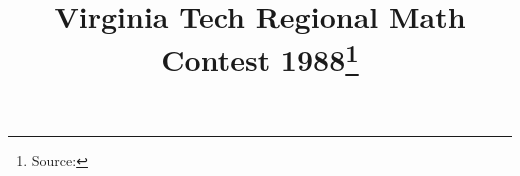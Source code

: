 \documentclass[10pt]{article}
\begin{document}
\title{Virginia Tech Regional Math Contest 1988\footnote{Source: \source}}
\author{\vspace{-2ex}}
\date{\vspace{-6ex}} %
\maketitle








\end{document}
